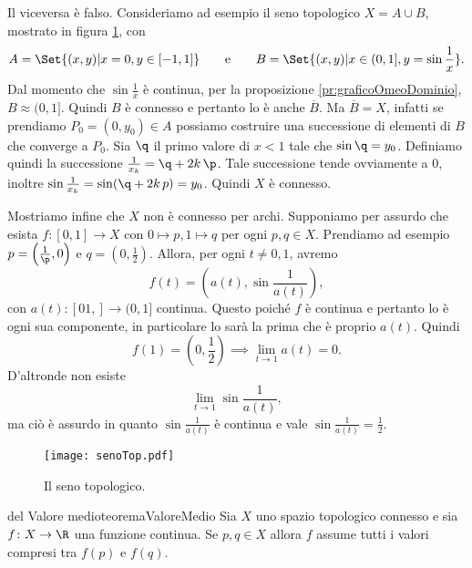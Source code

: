 \begin{ese}
	Il viceversa è falso.
	Consideriamo ad esempio il seno topologico \(X=A\cup B\), mostrato in figura \ref{fig:senoTop}, con
	\[
		A=\Set{(x,y) | x=0, y\in[-1,1]}\qquad\text{e}\qquad B=\Set{(x,y) | x\in(0,1],y=\sin \frac{1}{x}}.
	\]
	Dal momento che \(\sin \frac{1}{x}\) è continua, per la proposizione \ref{pr:graficoOmeoDominio}, \(B\approx (0,1]\).
	Quindi \(B\) è connesso e pertanto lo è anche \(\overline{B}\).
	Ma \(\overline{B}=X\), infatti se prendiamo \(P_0=(0,y_0)\in A\) possiamo costruire una successione di elementi di \(B\) che converge a \(P_0\).
	Sia \(\q\) il primo valore di \(x<1\) tale che \(\sin \q=y_0\).
	Definiamo quindi la successione \(\frac{1}{x_k} = \q+2k\,\p\).
	Tale successione tende ovviamente a \(0\), inoltre \(\sin \frac{1}{x_k}=\sin(\q+2k\,p)=y_0\).
	Quindi \(X\) è connesso.

	Mostriamo infine che \(X\) non è connesso per archi.
	Supponiamo per assurdo che esista \(f\colon [0,1]\to X\) con \(0\mapsto p,1\mapsto q\) per ogni \(p,q\in X\).
	Prendiamo ad esempio \(p=\left( \frac{1}{\p},0 \right)\) e \(q=\left( 0,\frac{1}{2} \right)\).
	Allora, per ogni \(t\neq 0,1\), avremo
	\[
		f(t) = \left( a(t),\sin \frac{1}{a(t)} \right),
	\]
	con \(a(t)\colon [01,]\to(0,1]\) continua.
	Questo poiché \(f\) è continua e pertanto lo è ogni sua componente, in particolare lo sarà la prima che è proprio \(a(t)\).
	Quindi
	\[
		f(1) = \left(0,\frac{1}{2}\right) \implies \lim_{t\to 1} a(t) = 0.
	\]
	D'altronde non esiste
	\[
		\lim_{t\to 1} \sin \frac{1}{a(t)},
	\]
	ma ciò è assurdo in quanto \(\sin \frac{1}{a(t)}\) è continua e vale \(\sin \frac{1}{a(t)}=\frac{1}{2}\).
\end{ese}

\begin{figure}[tp]
	\begin{centering}
		\texttt{[image: senoTop.pdf]}
		\caption{Il seno topologico.}
		\label{fig:senoTop}
	\end{centering}
\end{figure}

\begin{teor}{del Valore medio}{teoremaValoreMedio}
	Sia \(X\) uno spazio topologico connesso e sia \(f\colon X\to \R\) una funzione continua.
	Se \(p,q\in X\) allora \(f\) assume tutti i valori compresi tra \(f(p)\) e \(f(q)\).
\end{teor}

